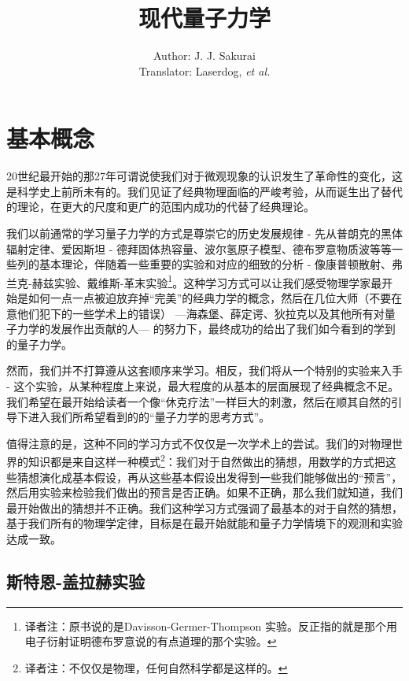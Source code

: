 \documentclass[UTF8,twoside]{ctexart}
\begin{document}
\title{现代量子力学}
\author{Author: J. J. Sakurai\\
Translator: Laserdog, \it et al. }
\date{}

\maketitle
\thispagestyle{empty}

\cleardoublepage
{}
\tableofcontents
\clearpage
\setcounter{page}{1}
\section{基本概念}
\noindent 20世纪最开始的那27年可谓说使我们对于微观现象的认识发生了革命性的变化，这是科学史上前所未有的。我们见证了经典物理面临的严峻考验，从而诞生出了替代的理论，在更大的尺度和更广的范围内成功的代替了经典理论。

我们以前通常的学习量子力学的方式是尊崇它的历史发展规律 - 先从普朗克的黑体辐射定律、爱因斯坦 - 德拜固体热容量、波尔氢原子模型、德布罗意物质波等等一些列的基本理论，伴随着一些重要的实验和对应的细致的分析 - 像康普顿散射、弗兰克-赫兹实验、戴维斯-革末实验\footnote{译者注：原书说的是Davisson-Germer-Thompson 实验。反正指的就是那个用电子衍射证明德布罗意说的有点道理的那个实验。}。这种学习方式可以让我们感受物理学家最开始是如何一点一点被迫放弃掉“完美”的经典力学的概念，然后在几位大师（不要在意他们犯下的一些学术上的错误） —海森堡、薛定谔、狄拉克以及其他所有对量子力学的发展作出贡献的人— 的努力下，最终成功的给出了我们如今看到的学到的量子力学。

然而，我们并不打算遵从这套顺序来学习。相反，我们将从一个特别的实验来入手 - 这个实验，从某种程度上来说，最大程度的从基本的层面展现了经典概念不足。我们希望在最开始给读者一个像“休克疗法”一样巨大的刺激，然后在顺其自然的引导下进入我们所希望看到的的“量子力学的思考方式”。

值得注意的是，这种不同的学习方式不仅仅是一次学术上的尝试。我们的对物理世界的知识都是来自这样一种模式\footnote{译者注：不仅仅是物理，任何自然科学都是这样的。}：我们对于自然做出的猜想，用数学的方式把这些猜想演化成基本假设，再从这些基本假设出发得到一些我们能够做出的“预言”，然后用实验来检验我们做出的预言是否正确。如果不正确，那么我们就知道，我们最开始做出的猜想并不正确。我们这种学习方式强调了最基本的对于自然的猜想，基于我们所有的物理学定律，目标是在最开始就能和量子力学情境下的观测和实验达成一致。
\clearpage
\subsection{斯特恩-盖拉赫实验}
\end{document}
